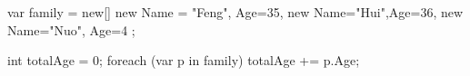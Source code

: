 \begin{CSharp}[匿名类]
            var family = new[]{
                new {Name = "Feng", Age=35},
                new {Name="Hui",Age=36},
                new {Name="Nuo", Age=4}
            };

            int totalAge = 0;
            foreach (var p in family)
            {
                totalAge += p.Age;
            }
\end{CSharp}